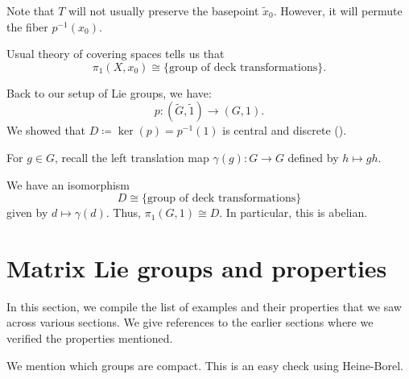 \documentclass[12pt]{article}
\begin{document}
Note that $T$ will not usually preserve the basepoint $\widetilde{x}_{0}$. 
However, it will permute the fiber $p^{-1}(x_{0})$.

Usual theory of covering spaces tells us that
\begin{equation*} 
	\pi_{1}(X, x_{0}) \cong \{\text{group of deck transformations}\}.
\end{equation*}

Back to our setup of Lie groups, we have:
\begin{equation*} 
	p \colon (\widetilde{G}, \widetilde{1}) \to (G, 1).
\end{equation*}
We showed that $D \coloneqq \ker(p) = p^{-1}(1)$ is central and discrete (). 

For $g \in G$, recall the left translation map $\gamma(g) : G \to G$ defined by $h \mapsto gh$.

\begin{thm} \label{thm:pi-one-kernel-covering}
	We have an isomorphism
	\begin{equation*} 
		D \cong \{\text{group of deck transformations}\}
	\end{equation*}
	given by $d \mapsto \gamma(d)$. \newline
	Thus, $\pi_{1}(G, 1) \cong D$. 
	In particular, this is abelian.
\end{thm}

\section{Matrix Lie groups and properties}

In this section, we compile the list of examples and their properties that we saw across various sections. 
We give references to the earlier sections where we verified the properties mentioned.

We mention which groups are compact. This is an easy check using Heine-Borel.
\end{document}
